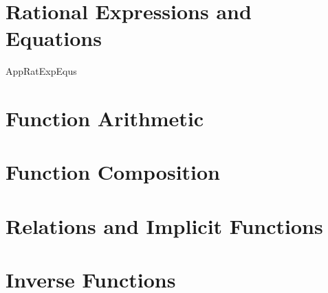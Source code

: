 \begin{comment}
\section{Graphs of Functions}



\newpage
\end{comment}
\section{Rational Expressions and Equations}

{AppRatExpEqus}

\section{Function Arithmetic}



\newpage

\section{Function Composition}



\newpage

\begin{comment}
\section{Transformations of Graphs}



\newpage
\end{comment}

\section{Relations and Implicit Functions}



\newpage

\section{Inverse Functions}



\newpage
